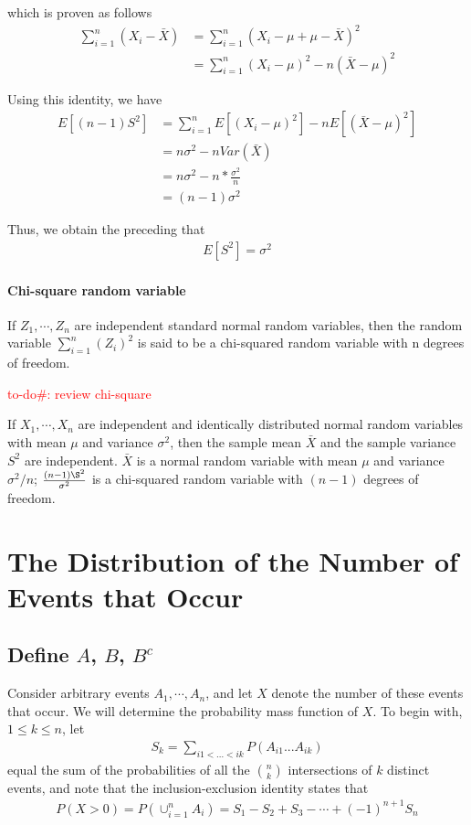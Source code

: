 \documentclass[10 pt,final]{article}
\newcounter{todocounter}
\newcommand{\todo}[1]{\stepcounter{todocounter}\textcolor{red}{to-do\#\arabic{todocounter}: #1}}
\newcommand{\impo}[1]{{\color{magenta} #1}}
\begin{document}
which is proven as follows
\begin{align*}
\sum^n_{i=1} (X_i - \bar{X}) & = \sum^n_{i=1} (X_i - \mu + \mu - \bar{X})^2 \\
& = \sum^n_{i=1} (X_i - \mu)^2 - n(\bar{X} - \mu)^2
\end{align*}

Using this identity, we have
\begin{align*}
E[(n-1)S^2] & = \sum^n_{i=1} E[(X_i - \mu)^2] - nE[(\bar{X} - \mu)^2] \\
& = n \sigma^2 - n Var(\bar{X}) \\
& = n \sigma^2 - n *\frac{\sigma^2}{n} \\
& = (n-1) \sigma^2
\end{align*}

Thus, we obtain the preceding that 
\begin{align*}
E[S^2] = \sigma^2
\end{align*}


\paragraph{Chi-square random variable} If $Z_1, \cdots, Z_n$ are independent standard normal random variables, then the random variable $\sum^n_{i=1} (Z_i)^2$ is said to be a \impo{chi-squared random variable} with \impo{n degrees of freedom}.

\todo{review chi-square}

\begin{proposition}
If $X_1, \cdots, X_n$ are independent and identically distributed normal random variables with mean $\mu$ and variance $\sigma^2$, then the sample mean $\bar{X}$ and the sample variance $S^2$ are independent. $\bar{X}$ is a normal random variable with \impo{mean $\mu$ and variance $\sigma^2/n$}; $\frac{(n-1)\S^2}{\sigma^2}$ is a chi-squared random variable with $(n-1)$ degrees of freedom.
\end{proposition}
\section{The Distribution of the Number of Events that Occur}

\subsection{Define $A$, $B$, $B^c$}
Consider arbitrary events $A_1, \cdots, A_n$, and let $X$ denote the number of these events that occur. We will determine the probability mass function of $X$. To begin with, $1 \leq k \leq n$, let 
\begin{align*}
S_k = \sum_{i1 < ... < ik} P(A_{i1}...A_{ik})
\end{align*}
equal the sum of the probabilities of all the $\binom{n}{k}$ intersections of $k$ distinct events, and note that the \impo{inclusion-exclusion} identity states that
\begin{align*}
P(X>0) = P(\cup^n_{i=1} A_i) = S_1 - S_2 + S_3 - \cdots + (-1)^{n+1} S_n
\end{align*}
\end{document}
